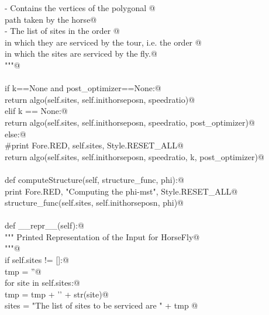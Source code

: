 \documentclass[11.5pt]{report}
\begin{document}
\begin{flushleft}
\begin{list}{}{}
\mbox{}\verb@          - Contains the vertices of the polygonal @\\
\mbox{}\verb@            path taken by the horse@\\
\mbox{}\verb@          - The list of sites in the order @\\
\mbox{}\verb@            in which they are serviced by the tour, i.e. the order @\\
\mbox{}\verb@            in which the sites are serviced by the fly.@\\
\mbox{}\verb@          """@\\
\mbox{}\verb@@\\
\mbox{}\verb@          if k==None and post_optimizer==None:@\\
\mbox{}\verb@                return algo(self.sites, self.inithorseposn, speedratio)@\\
\mbox{}\verb@          elif k == None:@\\
\mbox{}\verb@                return algo(self.sites, self.inithorseposn, speedratio, post_optimizer)@\\
\mbox{}\verb@          else:@\\
\mbox{}\verb@                #print Fore.RED, self.sites, Style.RESET_ALL@\\
\mbox{}\verb@                return algo(self.sites, self.inithorseposn, speedratio, k, post_optimizer)@\\
\mbox{}\verb@@\\
\mbox{}\verb@      def  computeStructure(self, structure_func, phi):@\\
\mbox{}\verb@          print Fore.RED, "Computing the phi-mst", Style.RESET_ALL@\\
\mbox{}\verb@          structure_func(self.sites, self.inithorseposn, phi)@\\
\mbox{}\verb@@\\
\mbox{}\verb@      def __repr__(self):@\\
\mbox{}\verb@          """ Printed Representation of the Input for HorseFly@\\
\mbox{}\verb@          """@\\
\mbox{}\verb@          if self.sites != []:@\\
\mbox{}\verb@              tmp = ''@\\
\mbox{}\verb@              for site in self.sites:@\\
\mbox{}\verb@                  tmp = tmp + '\n' + str(site)@\\
\mbox{}\verb@              sites = "The list of sites to be serviced are " + tmp    @\\

\end{list}
\end{flushleft}
\end{document}
